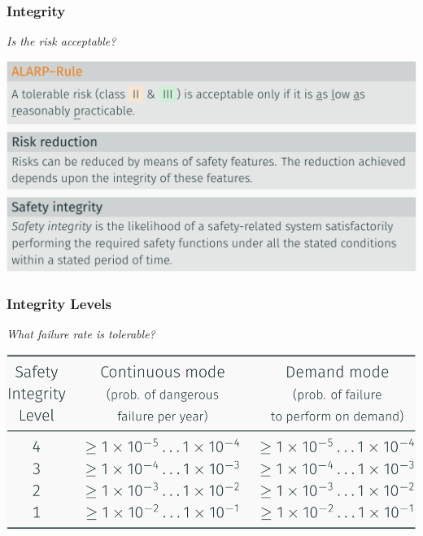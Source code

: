 \documentclass[
  10pt,
  a4paper,
  twocolumn]{article}
\begin{document}
\begin{minipage}[c][1cm][c]{.7\columnwidth}

\subsubsection{Integrity}\label{integrity}

\vspace{-2mm}{\color{Orchid}\faQuestionCircle[regular]} \emph{Is the
risk acceptable?}

\end{minipage}%
\begin{minipage}[c][1cm][c]{.3\columnwidth}
\makebox[30mm][r]{
\resizebox{!}{0.9cm}{
  
}}
\end{minipage}

\includegraphics{images/safety/image-6.png}

\subsubsection{Integrity Levels}\label{integrity-levels}

\vspace{-2mm}{\color{Orchid}\faQuestionCircle[regular]} \emph{What
failure rate is tolerable?}

\includegraphics{images/safety/image-7.png}
\end{document}
